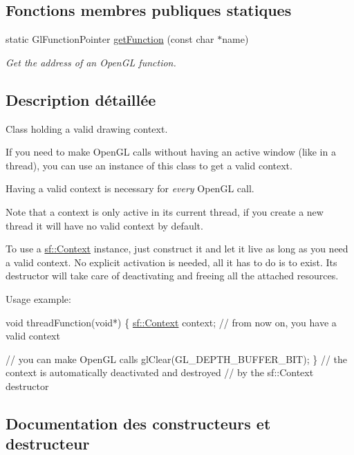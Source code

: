 \subsection*{Fonctions membres publiques statiques}
\begin{DoxyCompactItemize}
\item 
static Gl\+Function\+Pointer \hyperlink{classsf_1_1Context_a998980d311effdf6223ce40d934c23c3}{get\+Function} (const char $\ast$name)
\begin{DoxyCompactList}\small\item\em Get the address of an Open\+GL function. \end{DoxyCompactList}\end{DoxyCompactItemize}


\subsection{Description détaillée}
Class holding a valid drawing context. 

If you need to make Open\+GL calls without having an active window (like in a thread), you can use an instance of this class to get a valid context.

Having a valid context is necessary for {\itshape every} Open\+GL call.

Note that a context is only active in its current thread, if you create a new thread it will have no valid context by default.

To use a \hyperlink{classsf_1_1Context}{sf\+::\+Context} instance, just construct it and let it live as long as you need a valid context. No explicit activation is needed, all it has to do is to exist. Its destructor will take care of deactivating and freeing all the attached resources.

Usage example\+: 
\begin{DoxyCode}
\textcolor{keywordtype}{void} threadFunction(\textcolor{keywordtype}{void}*)
\{
   \hyperlink{classsf_1_1Context}{sf::Context} context;
   \textcolor{comment}{// from now on, you have a valid context}

   \textcolor{comment}{// you can make OpenGL calls}
   glClear(GL\_DEPTH\_BUFFER\_BIT);
\}
\textcolor{comment}{// the context is automatically deactivated and destroyed}
\textcolor{comment}{// by the sf::Context destructor}
\end{DoxyCode}
 

\subsection{Documentation des constructeurs et destructeur}
\mbox{\label{classsf_1_1Context_aba22797a790706ca2c5c04ee39f2b555}} 
